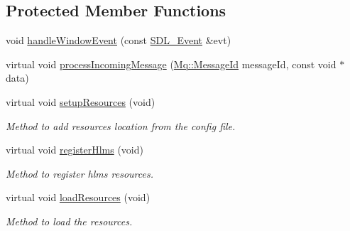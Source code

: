\subsection*{Protected Member Functions}
\begin{DoxyCompactItemize}
\item 
void \hyperlink{class_common_1_1_graphics_system_a16f86321da0331beaa393b9e1bbd48bd}{handle\+Window\+Event} (const \hyperlink{union_s_d_l___event}{S\+D\+L\+\_\+\+Event} \&evt)
\item 
virtual void \hyperlink{class_common_1_1_graphics_system_a8d286a151ed9a65f0eebe1ac119e2d59}{process\+Incoming\+Message} (\hyperlink{group___common_gaa8c87d2b450282716c906da283e149e6}{Mq\+::\+Message\+Id} message\+Id, const void $\ast$data)
\item 
\mbox{\label{class_common_1_1_graphics_system_a6ca699c2cd358f6101d7c00f605a515a}} 
virtual void \hyperlink{class_common_1_1_graphics_system_a6ca699c2cd358f6101d7c00f605a515a}{setup\+Resources} (void)
\begin{DoxyCompactList}\small\item\em Method to add resources location from the config file. \end{DoxyCompactList}\item 
\mbox{\label{class_common_1_1_graphics_system_a17ad5ae3ca1efd63f7436d977e7f2657}} 
virtual void \hyperlink{class_common_1_1_graphics_system_a17ad5ae3ca1efd63f7436d977e7f2657}{register\+Hlms} (void)
\begin{DoxyCompactList}\small\item\em Method to register hlms resources. \end{DoxyCompactList}\item 
\mbox{\label{class_common_1_1_graphics_system_ab91bf390248b3098db3b739e066092b1}} 
virtual void \hyperlink{class_common_1_1_graphics_system_ab91bf390248b3098db3b739e066092b1}{load\+Resources} (void)
\begin{DoxyCompactList}\small\item\em Method to load the resources. \end{DoxyCompactList}\item 
\mbox{\label{class_common_1_1_graphics_system_a6fc846f42d2011cfdeb465aa9ef44b20}} 

\end{DoxyCompactItemize}
